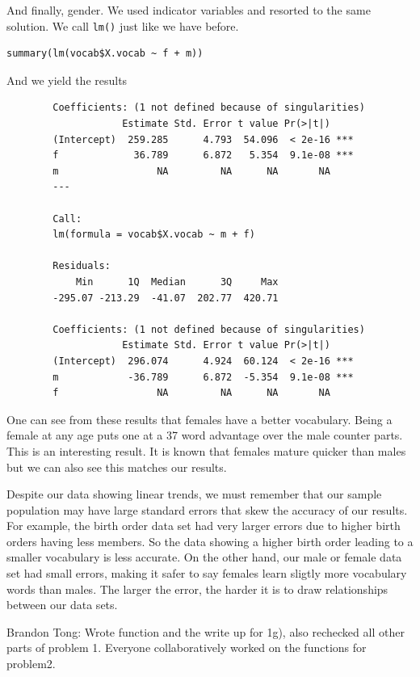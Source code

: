 \documentclass[fleqn]{article}
\begin{document}
	And finally, gender. We used indicator variables and resorted to the same solution. We call \texttt{lm()} just like we have before.
	\begin{verbatim}summary(lm(vocab$X.vocab ~ f + m))\end{verbatim}
	And we yield the results
	\begin{verbatim}
		Coefficients: (1 not defined because of singularities)
		            Estimate Std. Error t value Pr(>|t|)    
		(Intercept)  259.285      4.793  54.096  < 2e-16 ***
		f             36.789      6.872   5.354  9.1e-08 ***
		m                 NA         NA      NA       NA    
		---

		Call:
		lm(formula = vocab$X.vocab ~ m + f)

		Residuals:
		    Min      1Q  Median      3Q     Max 
		-295.07 -213.29  -41.07  202.77  420.71 

		Coefficients: (1 not defined because of singularities)
		            Estimate Std. Error t value Pr(>|t|)    
		(Intercept)  296.074      4.924  60.124  < 2e-16 ***
		m            -36.789      6.872  -5.354  9.1e-08 ***
		f                 NA         NA      NA       NA 
	\end{verbatim}
	One can see from these results that females have a better vocabulary. Being a female at any age puts one at a 37 word advantage over the male counter parts. This is an interesting result. It is known that females mature quicker than males but we can also see this matches our results.

	Despite our data showing linear trends, we must remember that our sample population may have large standard errors that skew the accuracy of our results. For example, the birth order data set had very larger errors due to higher birth orders having less members. So the data showing a higher birth order leading to a smaller vocabulary is less accurate. On the other hand, our male or female data set had small errors, making it safer to say females learn sligtly more vocabulary words than males. The larger the error, the harder it is to draw relationships between our data sets. 

\appendix

Brandon Tong: Wrote function and the write up for 1g), also rechecked all other parts of problem 1. Everyone collaboratively worked on the functions for problem2. 
	
\end{document}
